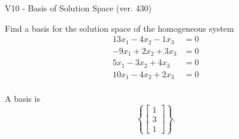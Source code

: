 \begin{exercise}
  \begin{exerciseTitle}V10 - Basis of Solution Space (ver. 430)\end{exerciseTitle}
  \begin{exerciseStatement}
    Find a basis for the solution space of the homogeneous system 
\begin{align*}
 13 x_ 1 -4 x_ 2 -1 x_ 3 &= 0  \\ 
  -9 x_ 1 + 2 x_ 2 + 3 x_ 3 &= 0  \\ 
  5 x_ 1 -3 x_ 2 + 4 x_ 3 &= 0  \\ 
  10 x_ 1 -4 x_ 2 + 2 x_ 3 &= 0  \\ 
 \end{align*}


 
  \end{exerciseStatement}

  \begin{exerciseAnswer}
   A basis is   
\[\left\{\left[\begin{array}{c}
1 \\
3 \\
1
\end{array}\right]\right\}.\]

  


  \end{exerciseAnswer}
\end{exercise}